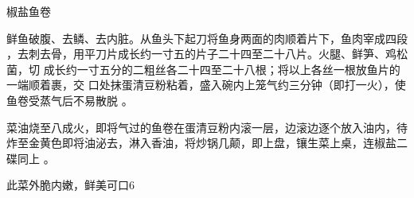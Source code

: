 \begin{recipe}{椒盐鱼卷}

\ingredients


\preparation

\step 鲜鱼破腹、去鳞、去内脏。从鱼头下起刀将鱼身两面的肉顺着片下，鱼肉宰成四段
，去刺去骨，用平刀片成长约一寸五的片子二十四至二十八片。火腿、鲜笋、鸡松菌，切
成长约一寸五分的二粗丝各二十四至二十八根；将以上各丝一根放鱼片的一端顺着裹，交
口处抹蛋清豆粉粘着，盛入碗内上笼气约三分钟（即打一火），使鱼卷受蒸气后不易散脱
。

\step 菜油烧至八成火，即将气过的鱼卷在蛋清豆粉内滚一层，边滚边逐个放入油内，待
炸至金黄色即将油泌去，淋入香油，将炒锅几颠，即上盘，镶生菜上桌，连椒盐二碟同上
。

\features

此菜外脆内嫩，鲜美可口6

\end{recipe}


